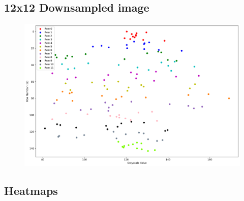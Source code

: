 \documentclass[11pt]{article}
\begin{document}
\begin{appendices}
\subsection{12x12 Downsampled image}\label{12x12Scatter}
\begin{figure}[h!]
  \centering
  \includegraphics[scale=0.4]{Images/12x12 Scatter.png}
\end{figure}

\newpage
\subsection{Heatmaps}\label{Heatmaps}
\begin{figure}[h!]
  \centering
  \hfill
\end{figure}


\end{appendices}
\end{document}
